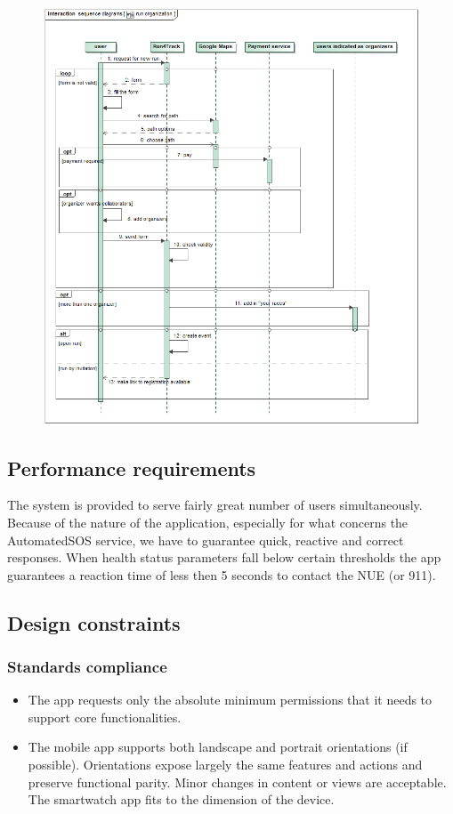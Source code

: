 \begin{figure}[h!] \ContinuedFloat
\centering
\includegraphics[scale=0.57]{sections/diagrams/run_organization.png} \newline
{}
\end{figure}

\clearpage

\subsection{Performance requirements}
The system is provided to serve fairly great number of users simultaneously. Because of the nature of the application, especially for what concerns the AutomatedSOS service, we have to guarantee quick, reactive and correct responses. When health status parameters fall below certain thresholds the app guarantees a reaction time of less then 5 seconds to contact the NUE (or 911).

\subsection{Design constraints}
\subsubsection{Standards compliance}
\begin{itemize}
\item The app requests only the absolute minimum permissions that it needs to support core functionalities.
\item The mobile app supports both landscape and portrait orientations (if possible). Orientations expose largely the same features and actions and preserve functional parity. Minor changes in content
or views are acceptable. The smartwatch app fits to the dimension of the device.
\end{itemize}

